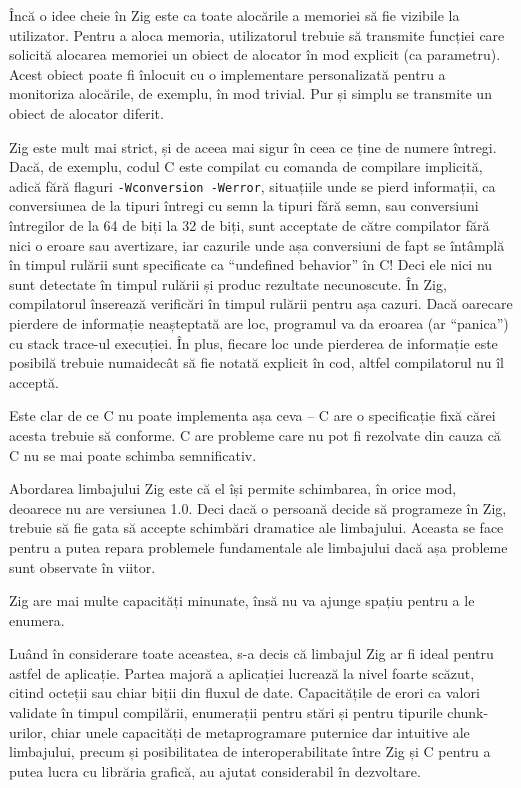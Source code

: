 \documentclass[a4paper,12pt]{report}
\begin{document}
Încă o idee cheie în Zig este ca toate alocările a memoriei să fie vizibile la utilizator.
Pentru a aloca memoria, utilizatorul trebuie să transmite funcției care solicită alocarea memoriei
un obiect de alocator în mod explicit (ca parametru).
Acest obiect poate fi înlocuit cu o implementare personalizată
pentru a monitoriza alocările, de exemplu, în mod trivial.
Pur și simplu se transmite un obiect de alocator diferit.

Zig este mult mai strict, și de aceea mai sigur în ceea ce ține de numere întregi.
Dacă, de exemplu, codul C este compilat cu comanda de compilare implicită,
adică fără flaguri \texttt{-Wconversion -Werror}, situațiile unde se pierd informații,
ca conversiunea de la tipuri întregi cu semn la tipuri fără semn, sau conversiuni întregilor
de la 64 de biți la 32 de biți, sunt acceptate de către compilator fără nici o eroare sau avertizare,
iar cazurile unde așa conversiuni de fapt se întâmplă în timpul rulării
sunt specificate ca ``undefined behavior'' în C!
Deci ele nici nu sunt detectate în timpul rulării și produc rezultate necunoscute.
În Zig, compilatorul înserează verificări în timpul rulării pentru așa cazuri.
Dacă oarecare pierdere de informație neașteptată are loc,
programul va da eroarea (ar ``panica'') cu stack trace-ul execuției.
În plus, fiecare loc unde pierderea de informație este posibilă trebuie numaidecât
să fie notată explicit în cod, altfel compilatorul nu îl acceptă.

Este clar de ce C nu poate implementa așa ceva --
C are o specificație fixă cărei acesta trebuie să conforme.
C are probleme care nu pot fi rezolvate din cauza că C nu se mai poate schimba semnificativ.

Abordarea limbajului Zig este că el își permite schimbarea,
în orice mod, deoarece nu are versiunea 1.0.
Deci dacă o persoană decide să programeze în Zig,
trebuie să fie gata să accepte schimbări dramatice ale limbajului.
Aceasta se face pentru a putea repara problemele fundamentale
ale limbajului dacă așa probleme sunt observate în viitor.

Zig are mai multe capacități minunate, însă nu va ajunge spațiu pentru a le enumera.

Luând în considerare toate aceastea, s-a decis că limbajul Zig ar fi ideal pentru astfel de aplicație.
Partea majoră a aplicației lucrează la nivel foarte scăzut,
citind octeții sau chiar biții din fluxul de date.
Capacitățile de erori ca valori validate în timpul compilării,
enumerații pentru stări și pentru tipurile chunk-urilor,
chiar unele capacități de metaprogramare puternice dar intuitive ale limbajului,
precum și posibilitatea de interoperabilitate între Zig și C pentru a putea lucra cu librăria grafică,
au ajutat considerabil în dezvoltare.
\end{document}

